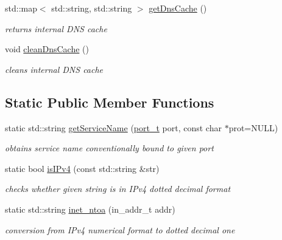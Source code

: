 \begin{CompactItemize}
std::map$<$ std::string, std::string $>$ \hyperlink{classsocketpp_1_1AddrHandler_4e10f2291b27d7db2a2860502721f960}{getDnsCache} ()
\begin{CompactList}\small\item\em returns internal DNS cache \item\end{CompactList}\item 
void \hyperlink{classsocketpp_1_1AddrHandler_89a2929af6c042fd7e16661303dfabcb}{cleanDnsCache} ()
\begin{CompactList}\small\item\em cleans internal DNS cache \item\end{CompactList}\end{CompactItemize}
\subsection*{Static Public Member Functions}
\begin{CompactItemize}
\item 
static std::string \hyperlink{classsocketpp_1_1AddrHandler_9c31dc05f530871b779a52f49adeb6b6}{getServiceName} (\hyperlink{namespacesocketpp_5517ef80f249b891a2ba64b95fc1e723}{port\_\-t} port, const char $\ast$prot=NULL)
\begin{CompactList}\small\item\em obtains service name conventionally bound to given port \item\end{CompactList}\item 
static bool \hyperlink{classsocketpp_1_1AddrHandler_652e24c273f7905cebf8d04b3cfef74d}{isIPv4} (const std::string \&str)
\begin{CompactList}\small\item\em checks whether given string is in IPv4 dotted decimal format \item\end{CompactList}\item 
static std::string \hyperlink{classsocketpp_1_1AddrHandler_a4377d84c8ea976aeada2b2eb0ac248d}{inet\_\-ntoa} (in\_\-addr\_\-t addr)
\begin{CompactList}\small\item\em conversion from IPv4 numerical format to dotted decimal one \item\end{CompactList}\end{CompactItemize}


